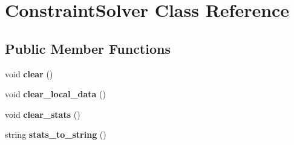 \hypertarget{classConstraintSolver}{\section{\-Constraint\-Solver \-Class \-Reference}
\label{classConstraintSolver}
}
\subsection*{\-Public \-Member \-Functions}
\begin{DoxyCompactItemize}
\item 
\hypertarget{classConstraintSolver_ad278d3c44ad966c1d816756350a49e2a}{void {\bfseries clear} ()}\label{classConstraintSolver_ad278d3c44ad966c1d816756350a49e2a}

\item 
\hypertarget{classConstraintSolver_abc3bd041971eb7c2a8c945fd345798bc}{void {\bfseries clear\-\_\-local\-\_\-data} ()}\label{classConstraintSolver_abc3bd041971eb7c2a8c945fd345798bc}

\item 
\hypertarget{classConstraintSolver_aba09ee6006bd332402370aa0273f29d8}{void {\bfseries clear\-\_\-stats} ()}\label{classConstraintSolver_aba09ee6006bd332402370aa0273f29d8}

\item 
\hypertarget{classConstraintSolver_a12fc56c78168495423040d1c3913fd7a}{string {\bfseries stats\-\_\-to\-\_\-string} ()}\label{classConstraintSolver_a12fc56c78168495423040d1c3913fd7a}

\end{DoxyCompactItemize}
